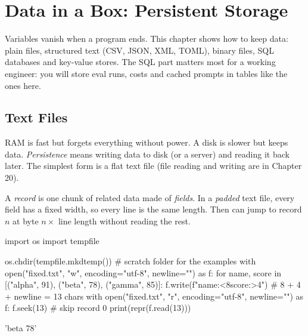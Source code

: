 \chapter{Data in a Box: Persistent Storage}


Variables vanish when a program ends. This chapter shows how to keep data: plain files,
structured text (CSV, JSON, XML, TOML), binary files, SQL databases and key-value stores.
The SQL part matters most for a working engineer: you will store eval runs, costs and
cached prompts in tables like the ones here.

\section{Text Files}

RAM is fast but forgets everything without power. A disk is slower but keeps data.
\emph{Persistence} means writing data to disk (or a server) and reading it back later.
The simplest form is a flat text file (file reading and writing are in Chapter 20).

A \emph{record} is one chunk of related data made of \emph{fields}. In a \emph{padded}
text file, every field has a fixed width, so every line is the same length. Then
 can jump to record \(n\) at byte \(n \times\) line length without reading
the rest.

\begin{pycode}
import os
import tempfile

os.chdir(tempfile.mkdtemp())           # scratch folder for the examples
with open("fixed.txt", "w", encoding="utf-8", newline="\n") as f:
    for name, score in [("alpha", 91), ("beta", 78), ("gamma", 85)]:
        f.write(f"{name:<8}{score:>4}\n")      # 8 + 4 + newline = 13 chars
with open("fixed.txt", "r", encoding="utf-8", newline="") as f:
    f.seek(13)                                 # skip record 0
    print(repr(f.read(13)))
\end{pycode}
\begin{rawcode}
'beta      78\n'
\end{rawcode}

